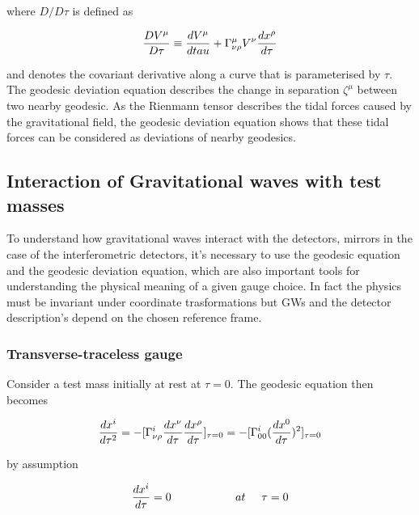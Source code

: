 \documentclass[binding=0.6cm, LaM]{sapthesis}
\begin{document}
	where $D/D\tau$ is defined as

		\begin{equation}
		{{DV^{\mu}}\over{D\tau}} \equiv {{dV^{\mu}}\over{dtau}} + \Gamma^{\mu}_{\nu\rho}V^{\nu}{{dx^{\rho}}\over{d\tau}}
		\end{equation}

	and denotes the covariant derivative along a curve that is parameterised by $\tau$. 
	The geodesic deviation equation describes the change in separation $\zeta^{\mu}$ between two nearby geodesic.
	As the Rienmann tensor describes the tidal forces caused by the gravitational field, 
	the geodesic deviation equation shows that these tidal forces can be considered as deviations of nearby geodesics.

\subsection{Interaction of Gravitational waves with test masses}

	To understand how gravitational waves interact with the detectors, mirrors in the case of the interferometric detectors, 
	it's necessary to use the geodesic equation and the geodesic deviation equation, which are also important tools 
	for understanding the physical meaning of a given gauge choice.
	In fact the physics must be invariant under coordinate trasformations but GWs and the detector description's depend on the chosen reference frame.

\subsubsection{Transverse-traceless gauge}

	Consider a test mass initially at rest at $\tau = 0$. The geodesic equation then becomes

		\begin{equation}
		{{dx^i}\over{d\tau^2}} = -[\Gamma^i_{\nu\rho}{{dx^{\nu}}\over{d\tau}}{{dx^{\rho}}\over{d\tau}}]_{\tau=0} \\ 
		= - [ \Gamma^i_{00}({{dx^0}\over{d\tau}})^2]_{\tau=0}
		\end{equation}

	by assumption
		
		\begin{equation}
		{{dx^i}\over{d\tau}} = 0 \hspace*{2cm} at \hspace*{0.5cm}\tau = 0
		\end{equation}
\end{document}
